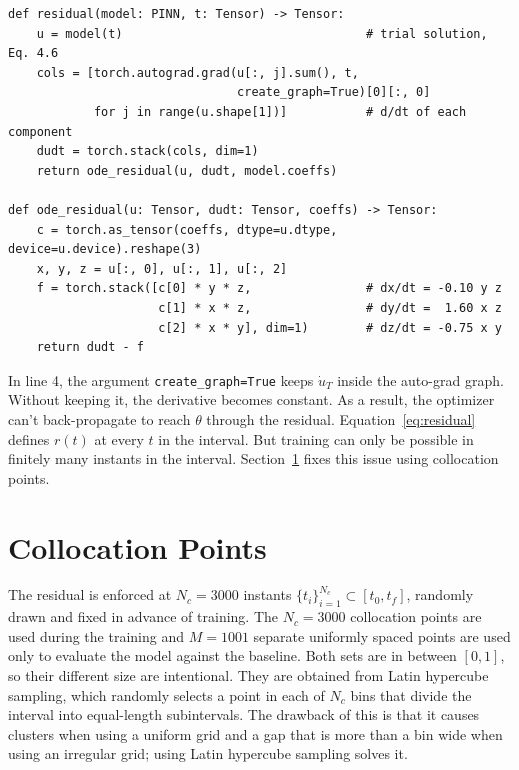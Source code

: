 \begin{lstlisting}[caption={The residual of Equation~\ref{eq:residual}, and the RHS it subtracts.}, label={lst:residual}]
def residual(model: PINN, t: Tensor) -> Tensor:
    u = model(t)                                  # trial solution, Eq. 4.6
    cols = [torch.autograd.grad(u[:, j].sum(), t,
                                create_graph=True)[0][:, 0]
            for j in range(u.shape[1])]           # d/dt of each component
    dudt = torch.stack(cols, dim=1)
    return ode_residual(u, dudt, model.coeffs)

def ode_residual(u: Tensor, dudt: Tensor, coeffs) -> Tensor:
    c = torch.as_tensor(coeffs, dtype=u.dtype, device=u.device).reshape(3)
    x, y, z = u[:, 0], u[:, 1], u[:, 2]
    f = torch.stack([c[0] * y * z,                # dx/dt = -0.10 y z
                     c[1] * x * z,                # dy/dt =  1.60 x z
                     c[2] * x * y], dim=1)        # dz/dt = -0.75 x y
    return dudt - f
\end{lstlisting}

In line 4, the argument \texttt{create\_graph=True} keeps $\dot{u}_T$ inside the auto-grad graph. Without keeping it, the derivative becomes constant. As a result, the optimizer can't back-propagate to reach $\theta$ through the residual. 
Equation~\ref{eq:residual} defines $r(t)$ at every $t$ in the interval. But training can only be possible in finitely many instants in the interval. Section~\ref{sec:impl_collocation} fixes this issue using collocation points. 

\section{Collocation Points}
\label{sec:impl_collocation}


The residual is enforced at $N_c = 3000$ instants $\{t_i\}_{i=1}^{N_c} \subset [t_0, t_f]$, randomly drawn and fixed in advance of training. The $N_c = 3000$ collocation points are used during the training and  $M=1001$ separate uniformly spaced points are used only to evaluate the model against the baseline. Both sets are in between $[0,1]$, so their different size are intentional. They are obtained from Latin hypercube sampling, which randomly selects a point in each of $N_c$ bins that divide the interval into equal-length subintervals. The drawback of this is that it causes clusters when using a uniform grid and a gap that is more than a bin wide when using an irregular grid; using Latin hypercube sampling solves it.


